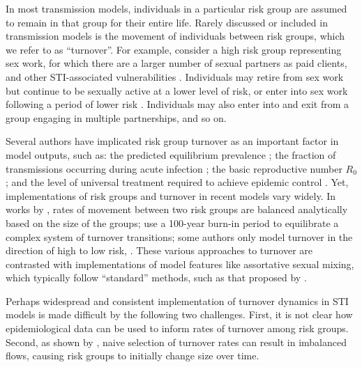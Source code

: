 In most transmission models, individuals in a particular risk group
are assumed to remain in that group for their entire life.
Rarely discussed or included in transmission models
is the movement of individuals between risk groups,
which we refer to as ``turnover''.
For example, consider a high risk group representing sex work,
for which there are a larger number of sexual partners as paid clients,
and other STI-associated vulnerabilities \citep{Watts2010}.
Individuals may
retire from sex work but continue to be sexually active at a lower level of risk,
or enter into sex work following a period of lower risk \citep{Boily2015}.
Individuals may also enter into and exit from
a group engaging in multiple partnerships, and so on.
\par
Several authors have implicated risk group turnover as 
an important factor in model outputs, such as:
the predicted equilibrium prevalence \citep{Stigum1994,Eaton2014};
the fraction of transmissions occurring during acute infection \citep{Zhang2012};
the basic reproductive number $R_0$ \citep{Henry2015}; and
the level of universal treatment required to achieve epidemic control \citep{Henry2015}.
Yet, implementations of risk groups and turnover in recent models vary widely.
In works by \citeauthor{Koopman1997},
rates of movement between two risk groups
are balanced analytically based on the size of the groups;
\citet{Boily2015} use a 100-year burn-in period
to equilibrate a complex system of turnover transitions;
some authors only model turnover in the direction of high to low risk,
\citep{Stigum1994,Eaton2014}.
These various approaches to turnover are contrasted with
implementations of model features like assortative sexual mixing,
which typically follow ``standard'' methods,
such as that proposed by \citet{Nold1980}.
\par
Perhaps widespread and consistent implementation of turnover dynamics in STI models
is made difficult by the following two challenges.
First, it is not clear how epidemiological data can be used to
inform rates of turnover among risk groups.
Second, as shown by \citet{Boily2015},
naive selection of turnover rates can result in imbalanced flows,
causing risk groups to initially change size over time.
